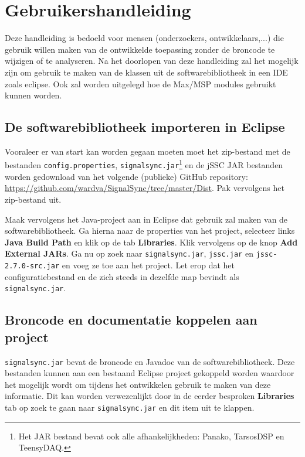 \chapter{Gebruikershandleiding}
\label{appendix-f}

Deze handleiding is bedoeld voor mensen (onderzoekers, ontwikkelaars,...) die gebruik willen maken van de ontwikkelde toepassing zonder de broncode te wijzigen of te analyseren. Na het doorlopen van deze handleiding zal het mogelijk zijn om gebruik te maken van de klassen uit de softwarebibliotheek in een IDE zoals eclipse. Ook zal worden uitgelegd hoe de Max/MSP modules gebruikt kunnen worden.

\section*{De softwarebibliotheek importeren in Eclipse}

Vooraleer er van start kan worden gegaan moeten moet het zip-bestand met de bestanden \texttt{config.properties}, \texttt{signalsync.jar}\footnote{Het JAR bestand bevat ook alle afhankelijkheden: Panako\cite{six2014panako}, TarsosDSP\cite{six2014tarsosdsp} en TeensyDAQ.} en de jSSC JAR bestanden worden gedownload van het volgende (publieke) GitHub repository:
\url{https://github.com/wardva/SignalSync/tree/master/Dist}. Pak vervolgens het zip-bestand uit.

Maak vervolgens het Java-project aan in Eclipse dat gebruik zal maken van de softwarebibliotheek. Ga hierna naar de properties van het project, selecteer links \textbf{Java Build Path} en klik op de tab \textbf{Libraries}. Klik vervolgens op de knop \textbf{Add External JARs}. Ga nu op zoek naar \texttt{signalsync.jar}, \texttt{jssc.jar} en \texttt{jssc-2.7.0-src.jar} en voeg ze toe aan het project. Let erop dat het configuratiebestand en de zich steeds in dezelfde map bevindt als \texttt{signalsync.jar}.

\section*{Broncode en documentatie koppelen aan project}

\texttt{signalsync.jar} bevat de broncode en Javadoc van de softwarebibliotheek. Deze bestanden kunnen aan een bestaand Eclipse project gekoppeld worden waardoor het mogelijk wordt om tijdens het ontwikkelen gebruik te maken van deze informatie. Dit kan worden verwezenlijkt door in de eerder besproken \textbf{Libraries} tab op zoek te gaan naar \texttt{signalsync.jar} en dit item uit te klappen. 

